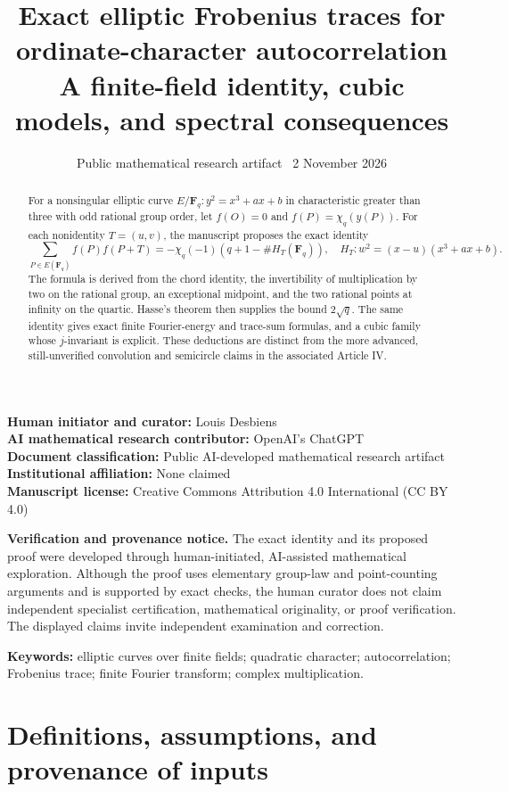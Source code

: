 \documentclass[11pt,a4paper]{article}
\title{Exact elliptic Frobenius traces for ordinate-character autocorrelation\\[5pt]
\large A finite-field identity, cubic models, and spectral consequences}
\author{}
\date{Public mathematical research artifact \textbar\ 2 November 2026}
\numberwithin{equation}{section}
\begin{document}
\maketitle
\noindent\textbf{Human initiator and curator:} Louis Desbiens\\
\textbf{AI mathematical research contributor:} OpenAI's ChatGPT\\
\textbf{Document classification:} Public AI-developed mathematical research artifact\\
\textbf{Institutional affiliation:} None claimed\\
\textbf{Manuscript license:} Creative Commons Attribution 4.0 International (CC BY 4.0)

\noindent\textbf{Verification and provenance notice.}
The exact identity and its proposed proof were developed through
human-initiated, AI-assisted mathematical exploration. Although the
proof uses elementary group-law and point-counting arguments and is
supported by exact checks, the human curator does not claim independent
specialist certification, mathematical originality, or proof verification.
The displayed claims invite independent examination and correction.

\begin{abstract}
For a nonsingular elliptic curve \(E/\mathbf F_q:y^2=x^3+ax+b\)
in characteristic greater than three with odd rational group order,
let \(f(O)=0\) and \(f(P)=\chi_q(y(P))\). For each nonidentity
\(T=(u,v)\), the manuscript proposes the exact identity
\[
\sum_{P\in E(\mathbf F_q)}f(P)f(P+T)
 =-\chi_q(-1)\left(q+1-\#H_T(\mathbf F_q)\right),
\quad H_T:w^2=(x-u)(x^3+ax+b).
\]
The formula is derived from the chord identity, the invertibility of
multiplication by two on the rational group, an exceptional midpoint,
and the two rational points at infinity on the quartic. Hasse's theorem
then supplies the bound \(2\sqrt q\). The same identity gives exact
finite Fourier-energy and trace-sum formulas, and a cubic family whose
\(j\)-invariant is explicit. These deductions are distinct from the
more advanced, still-unverified convolution and semicircle claims in
the associated Article IV.
\end{abstract}

\noindent\textbf{Keywords:} elliptic curves over finite fields;
quadratic character; autocorrelation; Frobenius trace; finite
Fourier transform; complex multiplication.
\section{Definitions, assumptions, and provenance of inputs}
\end{document}
